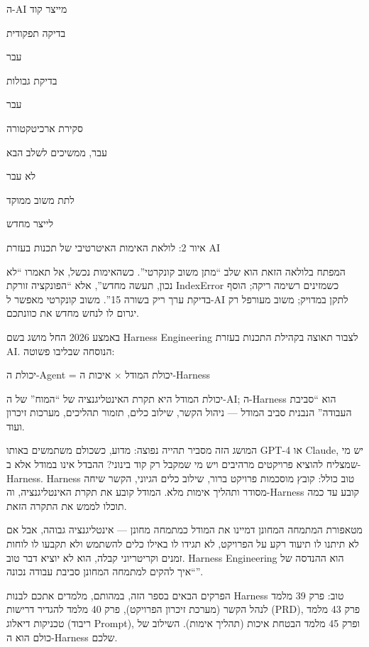 ה-AI מייצר קוד

בדיקה תפקודית

עבר

בדיקת גבולות

עבר

סקירת ארכיטקטורה

עבר, ממשיכים לשלב הבא

לא עבר

לתת משוב ממוקד

לייצר מחדש

\begin{center}\small\color{gray}איור 2: לולאת האימות האיטרטיבי של תכנות בעזרת AI\end{center}

המפתח בלולאה הזאת הוא שלב “מתן משוב קונקרטי”. כשהאימות נכשל, אל תאמרו “לא נכון, תעשה מחדש”, אלא “הפונקציה זורקת IndexError כשמזינים רשימה ריקה; הוסף בדיקת ערך ריק בשורה 15”. משוב קונקרטי מאפשר ל-AI לתקן במדויק; משוב מעורפל רק יגרום לו לנחש מחדש את כוונתכם.


באמצע 2026 החל מושג בשם Harness Engineering לצבור תאוצה בקהילת התכנות בעזרת AI. הנוסחה שבליבו פשוטה:

יכולת ה-Agent = יכולת המודל × איכות ה-Harness

יכולת המודל היא תקרת האינטליגנציה של “המוח” של ה-AI; ה-Harness הוא “סביבת העבודה” הנבנית סביב המודל — ניהול הקשר, שילוב כלים, תזמור תהליכים, מערכות זיכרון ועוד.

המושג הזה מסביר תהייה נפוצה: מדוע, כשכולם משתמשים באותו GPT-4 או Claude, יש מי שמצליח להוציא פרויקטים מרהיבים ויש מי שמקבל רק קוד בינוני? ההבדל אינו במודל אלא ב-Harness. Harness טוב כולל: קובץ מוסכמות פרויקט ברור, שילוב כלים הגיוני, הקשר שיחה מסודר ותהליך אימות מלא. המודל קובע את תקרת האינטליגנציה, וה-Harness קובע עד כמה תוכלו לממש את התקרה הזאת.

\begin{tcbinfo}{מטאפורת המתמחה המחונן}
דמיינו את המודל כמתמחה מחונן — אינטליגנציה גבוהה, אבל אם לא תיתנו לו תיעוד רקע על הפרויקט, לא תגידו לו באילו כלים להשתמש ולא תקבעו לו לוחות זמנים וקריטריוני קבלה, הוא לא יוציא דבר טוב. Harness Engineering הוא ההנדסה של “איך להקים למתמחה המחונן סביבת עבודה נכונה”.

\end{tcbinfo}

הפרקים הבאים בספר הזה, במהותם, מלמדים אתכם לבנות Harness טוב: פרק 39 מלמד לנהל הקשר (מערכת זיכרון הפרויקט), פרק 40 מלמד להגדיר דרישות (PRD), פרק 43 מלמד טכניקות דיאלוג (ריבוד Prompt), ופרק 45 מלמד הבטחת איכות (תהליך אימות). השילוב של כולם הוא ה-Harness שלכם.


